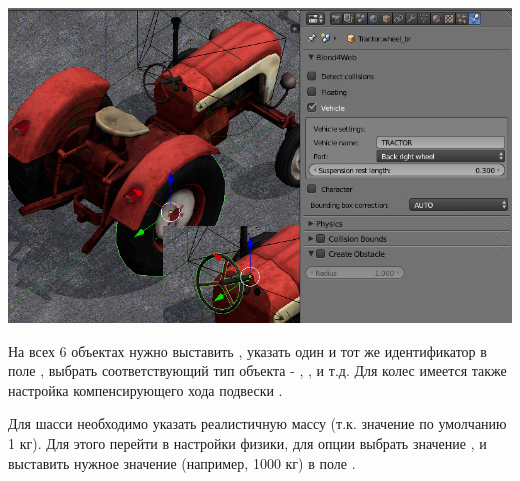 \documentclass[a4paper,12pt,oneside]{sphinxmanual}
\begin{document}
\includegraphics[width=1.000\linewidth]{physics_vehicle_wheeled.jpg}

\begin{DUlineblock}{0em}
\item[] 
\end{DUlineblock}

На всех 6 объектах нужно выставить , указать один и тот же идентификатор в поле , выбрать соответствующий тип объекта - , ,  и т.д. Для колес имеется также настройка компенсирующего хода подвески .

Для шасси необходимо указать реалистичную массу (т.к. значение по умолчанию 1 кг). Для этого перейти в настройки физики, для опции  выбрать значение , и выставить нужное значение (например, 1000 кг) в поле .
\end{document}

